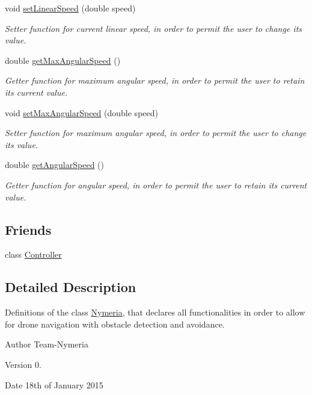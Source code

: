 \begin{DoxyCompactItemize}
void \hyperlink{class_nymeria_a6217513fd20574947ec6ca0405668c1a}{set\+Linear\+Speed} (double speed)
\begin{DoxyCompactList}\small\item\em Setter function for current linear speed, in order to permit the user to change its value. \end{DoxyCompactList}\item 
double \hyperlink{class_nymeria_abee78301bcaf62d61f2777aa2c5b9449}{get\+Max\+Angular\+Speed} ()
\begin{DoxyCompactList}\small\item\em Getter function for maximum angular speed, in order to permit the user to retain its current value. \end{DoxyCompactList}\item 
void \hyperlink{class_nymeria_a8f4694ca2039c6893706566b8b368833}{set\+Max\+Angular\+Speed} (double speed)
\begin{DoxyCompactList}\small\item\em Setter function for maximum angular speed, in order to permit the user to change its value. \end{DoxyCompactList}\item 
double \hyperlink{class_nymeria_a5020233162c927226ff48dc211dbb225}{get\+Angular\+Speed} ()
\begin{DoxyCompactList}\small\item\em Getter function for angular speed, in order to permit the user to retain its current value. \end{DoxyCompactList}\end{DoxyCompactItemize}
\subsection*{Friends}
\begin{DoxyCompactItemize}
\item 
class \hyperlink{class_nymeria_ac3456fd331a58b288082abca310c7a99}{Controller}
\end{DoxyCompactItemize}


\subsection{Detailed Description}
Definitions of the class \hyperlink{class_nymeria}{Nymeria}, that declares all functionalities in order to allow for drone navigation with obstacle detection and avoidance. 

\begin{DoxyAuthor}{Author}
Team-\/\+Nymeria 
\end{DoxyAuthor}
\begin{DoxyVersion}{Version}
0. 
\end{DoxyVersion}
\begin{DoxyDate}{Date}
18th of January 2015 
\end{DoxyDate}


